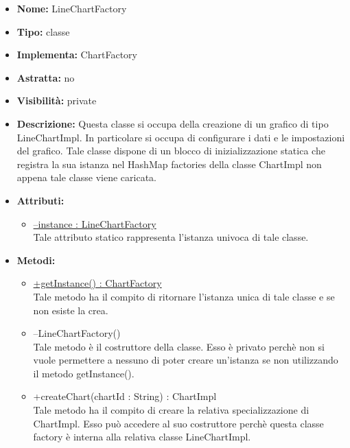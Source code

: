 			
			\begin{itemize}
			\item \textbf{Nome:} LineChartFactory
			\item \textbf{Tipo:} classe
			
		\item \textbf{Implementa:}
		ChartFactory
		\item \textbf{Astratta:}
		no
			\item \textbf{Visibilità:} private
			\item \textbf{Descrizione:} Questa classe si occupa della creazione di un grafico di tipo LineChartImpl. In particolare si occupa di configurare i dati e le impostazioni del grafico. Tale classe dispone di un blocco di inizializzazione statica che registra la sua istanza nel HashMap factories della classe ChartImpl non appena tale classe viene caricata.
			\item \textbf{Attributi:}
				\begin{itemize}
				\setlength{\itemsep}{5pt}
				
					\item[\ding{111}] \underline{--instance : LineChartFactory} \\ [1mm] Tale attributo statico rappresenta l'istanza univoca di tale classe.
				\end{itemize}
		
			\item \textbf{Metodi:}
				\begin{itemize}
				\setlength{\itemsep}{5pt}
				
					\item[\ding{111}] {\underline{+getInstance() : ChartFactory}} \\ [1mm] Tale metodo ha il compito di ritornare l'istanza unica di tale classe e se non esiste la crea.
					\item[\ding{111}] {{--LineChartFactory()}} \\ [1mm] Tale metodo è il costruttore della classe. Esso è privato perchè non si vuole permettere a nessuno di poter creare un'istanza se non utilizzando il metodo getInstance().
					\item[\ding{111}] {{+createChart(chartId : String) : ChartImpl}} \\ [1mm] Tale metodo ha il compito di creare la relativa specializzazione di ChartImpl. Esso può accedere al suo costruttore perchè questa classe factory è interna alla relativa classe LineChartImpl.
				\end{itemize}
		
			\end{itemize}


